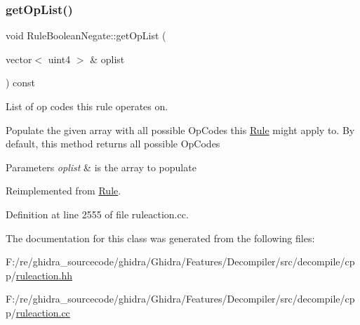 \subsubsection{\texorpdfstring{getOpList()}{getOpList()}}
{\footnotesize\ttfamily void Rule\+Boolean\+Negate\+::get\+Op\+List (\begin{DoxyParamCaption}\item[{vector$<$ uint4 $>$ \&}]{oplist }\end{DoxyParamCaption}) const\hspace{0.3cm}{\ttfamily [virtual]}}



List of op codes this rule operates on. 

Populate the given array with all possible Op\+Codes this \mbox{\hyperlink{class_rule}{Rule}} might apply to. By default, this method returns all possible Op\+Codes 
\begin{DoxyParams}{Parameters}
{\em oplist} & is the array to populate \\
\hline
\end{DoxyParams}


Reimplemented from \mbox{\hyperlink{class_rule_a4023bfc7825de0ab866790551856d10e}{Rule}}.



Definition at line 2555 of file ruleaction.\+cc.



The documentation for this class was generated from the following files\+:\begin{DoxyCompactItemize}
\item 
F\+:/re/ghidra\+\_\+sourcecode/ghidra/\+Ghidra/\+Features/\+Decompiler/src/decompile/cpp/\mbox{\hyperlink{ruleaction_8hh}{ruleaction.\+hh}}\item 
F\+:/re/ghidra\+\_\+sourcecode/ghidra/\+Ghidra/\+Features/\+Decompiler/src/decompile/cpp/\mbox{\hyperlink{ruleaction_8cc}{ruleaction.\+cc}}\end{DoxyCompactItemize}
